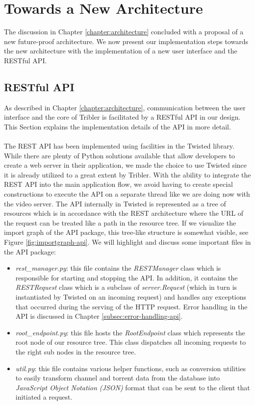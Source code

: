 \chapter{Towards a New Architecture}
\label{chapter:towards-new-architecture}
The discussion in Chapter \ref{chapter:architecture} concluded with a proposal of a new future-proof architecture. We now present our implementation steps towards the new architecture with the implementation of a new user interface and the RESTful API.

\section{RESTful API}
As described in Chapter \ref{chapter:architecture}, communication between the user interface and the core of Tribler is facilitated by a RESTful API in our design. This Section explains the implementation details of the API in more detail.\\\\
The REST API has been implemented using facilities in the Twisted library. While there are plenty of Python solutions available that allow developers to create a web server in their application, we made the choice to use Twisted since it is already utilized to a great extent by Tribler. With the ability to integrate the REST API into the main application flow, we avoid having to create special constructions to execute the API on a separate thread like we are doing now with the video server. The API internally in Twisted is represented as a tree of resources which is in accordance with the REST architecture where the URL of the request can be treated like a path in the resource tree. If we visualize the import graph of the API package, this tree-like structure is somewhat visible, see Figure \ref{fig:importgraph-api}. We will highlight and discuss some important files in the API package:
\begin{itemize}
	\item \emph{rest\_manager.py}: this file contains the \emph{RESTManager} class which is responsible for starting and stopping the API. In addition, it  contains the \emph{RESTRequest} class which is a subclass of \emph{server.Request} (which in turn is instantiated by Twisted on an incoming request) and handles any exceptions that occurred during the serving of the HTTP request. Error handling in the API is discussed in Chapter \ref{subsec:error-handling-api}.
	\item \emph{root\_endpoint.py}: this file hosts the \emph{RootEndpoint} class which represents the root node of our resource tree. This class dispatches all incoming requests to the right sub nodes in the resource tree.
	\item \emph{util.py}: this file contains various helper functions, such as conversion utilities to easily transform channel and torrent data from the database into \emph{JavaScript Object Notation (JSON)} format that can be sent to the client that initiated a request.
\end{itemize}

